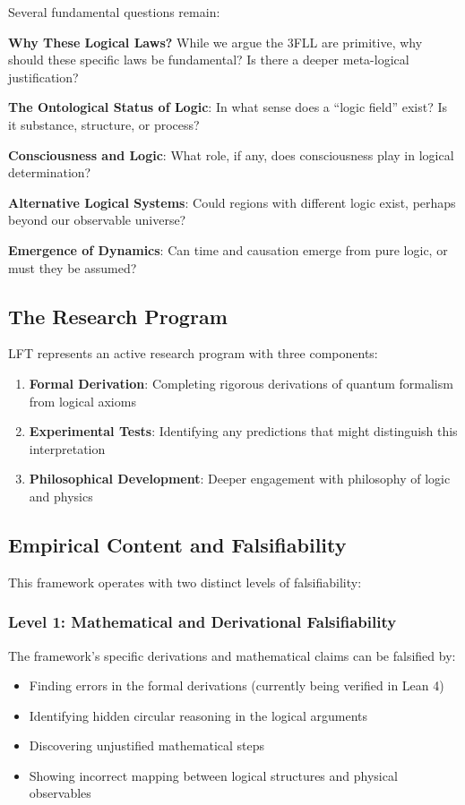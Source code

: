 \documentclass[12pt,a4paper]{article}
\begin{document}
Several fundamental questions remain:

\textbf{Why These Logical Laws?} While we argue the 3FLL are primitive, why should these specific laws be fundamental? Is there a deeper meta-logical justification?

\textbf{The Ontological Status of Logic}: In what sense does a ``logic field'' exist? Is it substance, structure, or process?

\textbf{Consciousness and Logic}: What role, if any, does consciousness play in logical determination?

\textbf{Alternative Logical Systems}: Could regions with different logic exist, perhaps beyond our observable universe?

\textbf{Emergence of Dynamics}: Can time and causation emerge from pure logic, or must they be assumed?

\subsection{The Research Program}

LFT represents an active research program with three components:

\begin{enumerate}
\item \textbf{Formal Derivation}: Completing rigorous derivations of quantum formalism from logical axioms
\item \textbf{Experimental Tests}: Identifying any predictions that might distinguish this interpretation
\item \textbf{Philosophical Development}: Deeper engagement with philosophy of logic and physics
\end{enumerate}

\subsection{Empirical Content and Falsifiability}

This framework operates with two distinct levels of falsifiability:

\subsubsection{Level 1: Mathematical and Derivational Falsifiability}

The framework's specific derivations and mathematical claims can be falsified by:
\begin{itemize}
\item Finding errors in the formal derivations (currently being verified in Lean 4)
\item Identifying hidden circular reasoning in the logical arguments
\item Discovering unjustified mathematical steps
\item Showing incorrect mapping between logical structures and physical observables
\end{itemize}
\end{document}
